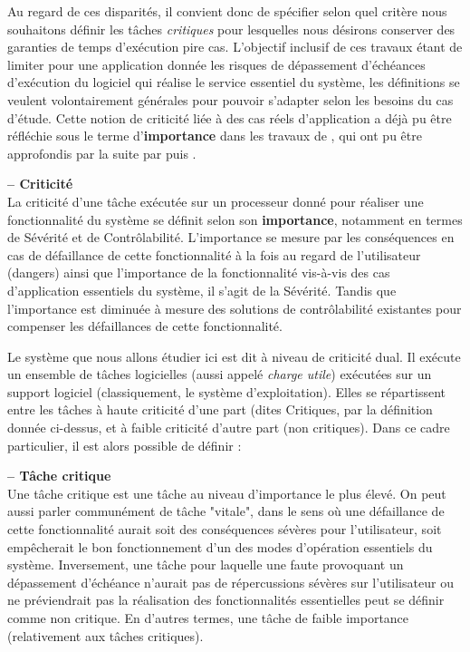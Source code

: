 \documentclass[french, a4paper, 11pt, twoside, pdftex]{StyleThese}
\begin{document}
	Au regard de ces disparités, il convient donc de spécifier selon quel critère nous souhaitons définir les tâches \textit{critiques} pour lesquelles nous désirons conserver des garanties de temps d'exécution pire cas. L'objectif inclusif de ces travaux étant de limiter pour une application donnée les risques de dépassement d'échéances d'exécution du logiciel qui réalise le service essentiel du système, les définitions se veulent volontairement générales pour pouvoir s'adapter selon les besoins du cas d'étude. Cette notion de criticité liée à des cas réels d'application a déjà pu être réfléchie sous le terme d'\textbf{importance} dans les travaux de \cite{fleming_extending_2013}, qui ont pu être approfondis par la suite par \cite{bletsas_decoupling_2018} puis \cite{sundar_practical_2019}.
	
	\begin{definition}\textbf{ -- Criticité} \\
		La criticité d'une tâche exécutée sur un processeur donné pour réaliser une fonctionnalité du système se définit selon son \textbf{importance}, notamment en termes de Sévérité et de Contrôlabilité. L'importance se mesure par les conséquences en cas de défaillance de cette fonctionnalité à la fois au regard de l'utilisateur (dangers) ainsi que l'importance de la fonctionnalité vis-à-vis des cas d'application essentiels du système, il s'agit de la Sévérité. Tandis que l'importance est diminuée à mesure des solutions de contrôlabilité existantes pour compenser les défaillances de cette fonctionnalité.
	\end{definition}

    Le système que nous allons étudier ici est dit à niveau de criticité dual. Il exécute un ensemble de tâches logicielles (aussi appelé \textit{charge utile}) exécutées sur un support logiciel (classiquement, le système d'exploitation). Elles se répartissent entre les tâches à haute criticité d'une part (dites Critiques, par la définition donnée ci-dessus, et à faible criticité d'autre part (non critiques). 	Dans ce cadre particulier, il est alors possible de définir : 
    
    \begin{definition}\textbf{ -- Tâche critique} \\
    	Une tâche critique est une tâche au niveau d'importance le plus élevé. On peut aussi parler communément de tâche "vitale", dans le sens où une défaillance de cette fonctionnalité aurait soit des conséquences sévères pour l'utilisateur, soit empêcherait le bon fonctionnement d'un des modes d'opération essentiels du système.
    	Inversement, une tâche pour laquelle une faute provoquant un dépassement d'échéance n'aurait pas de répercussions sévères sur l'utilisateur ou ne préviendrait pas la réalisation des fonctionnalités essentielles peut se définir comme non critique. En d'autres termes, une tâche de faible importance (relativement aux tâches critiques).
    \end{definition}
    
\end{document}

